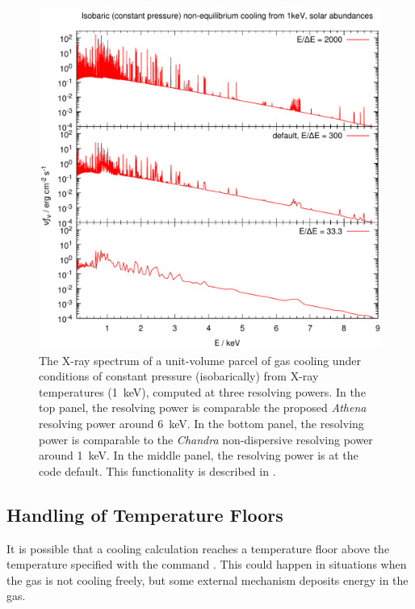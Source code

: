\begin{figure}
	\centering
	\includegraphics[scale=0.9]{cooling-flow-spectrum-hazy1}
	\caption[Cooling flow]
	{	\label{fig:coolingFlow}
		The X-ray spectrum of a unit-volume parcel of gas cooling under conditions
		of constant pressure (isobarically) from X-ray temperatures (1~keV), computed
		at three resolving powers.
		In the top panel, the resolving power is comparable the proposed {\it Athena}
		resolving power around 6~keV.
		In the bottom panel, the resolving power is comparable to the {\it Chandra}
		non-dispersive resolving power around 1~keV.
		In the middle panel, the resolving power is at the code default.
		This functionality is described in \citet{Chatzikos2015}.
	}
\end{figure}


\subsection{Handling of Temperature Floors}
\label{sec:Cooling-TempFloor}

It is possible that a cooling calculation reaches a temperature floor above
the temperature specified with the command
.
This could happen in situations when the gas is not cooling freely, but some
external mechanism deposits energy in the gas.

